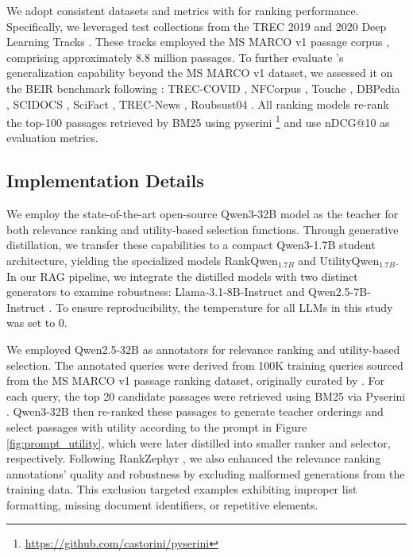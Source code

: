  We adopt consistent datasets and metrics with \citet{sun2023chatgpt} for ranking performance. 
Specifically, we leveraged test collections from the TREC 2019 and 2020 Deep Learning Tracks \cite{trec_cl19}. 
These tracks employed the MS MARCO v1 passage corpus \cite{bajaj2016ms}, comprising approximately 8.8 million passages. 
To further evaluate \rank's generalization capability beyond the MS MARCO v1 dataset, we assessed it on the BEIR benchmark \cite{thakur2021beir} following \citet{sun2023chatgpt}: TREC-COVID \cite{voorhees2021trec}, NFCorpus \cite{boteva2016full}, Touche \cite{bondarenko2020overview}, DBPedia \cite{hasibi2017dbpedia}, SCIDOCS \cite{cohan2020specter}, SciFact \cite{wadden2020fact}, TREC-News \cite{trec-news}, Roubsust04 \cite{Robust04}. All ranking models re-rank the top-100 passages retrieved by BM25 using pyserini \footnote{\url{https://github.com/castorini/pyserini}} and use nDCG@10  as evaluation metrics. 

\subsection{Implementation Details} 
We employ the state-of-the-art open-source Qwen3-32B \cite{qwen3technicalreport} model as the teacher for both relevance ranking and utility-based selection functions. 
Through generative distillation, we transfer these capabilities to a compact Qwen3-1.7B student architecture, yielding the specialized models RankQwen$_{1.7B}$ and UtilityQwen$_{1.7B}$. 
In our RAG pipeline, we integrate the distilled models with two distinct generators to examine robustness: Llama-3.1-8B-Instruct \cite{dubey2024llama} and Qwen2.5-7B-Instruct \cite{qwen2.5}. 
To ensure reproducibility, the temperature for all LLMs in this study was set to 0. 

We employed Qwen2.5-32B as annotators for relevance ranking and utility-based selection. 
The annotated queries were derived from 100K training queries sourced from the MS MARCO v1 passage ranking dataset, originally curated by \citet{sun2023chatgpt}. 
For each query, the top 20 candidate passages were retrieved using BM25 via Pyserini \cite{Lin_etal_SIGIR2021_Pyserini}. 
Qwen3-32B then re-ranked these passages to generate teacher orderings and select passages with utility according to the prompt in Figure \ref{fig:prompt_utility}, which were later distilled into smaller ranker and selector, respectively. 
Following RankZephyr \cite{pradeep2023rankzephyr}, we also enhanced the relevance ranking annotations' quality and robustness by excluding malformed generations from the training data. This exclusion targeted examples exhibiting improper list formatting, missing document identifiers, or repetitive elements. 

